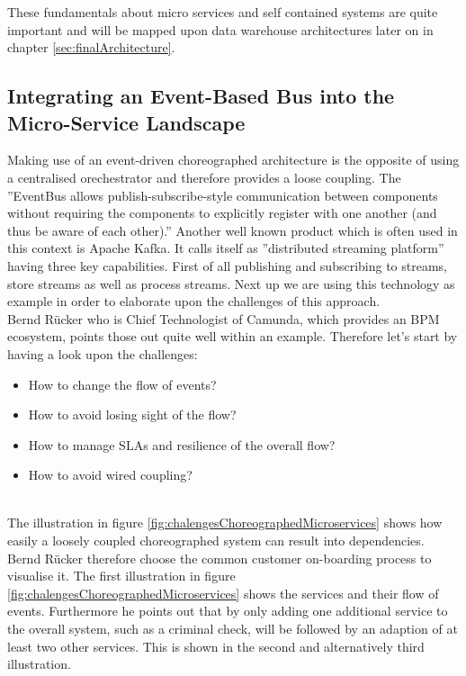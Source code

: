 These fundamentals about micro services and self contained systems are quite important and will be mapped upon data warehouse architectures later on in chapter \ref{sec:finalArchitecture}.

\subsection{Integrating an Event-Based Bus into the Micro-Service Landscape}
Making use of an event-driven choreographed architecture is the opposite of using a centralised orechestrator and therefore provides a loose coupling. The ''EventBus allows publish-subscribe-style communication between components without requiring the components to explicitly register with one another (and thus be aware of each other).'' \cite{EventBusExplained} \newline
Another well known product which is often used in this context is Apache Kafka. It calls itself as ''distributed streaming platform'' having three key capabilities. First of all publishing and subscribing to streams, store streams as well as process streams.\cite{kafka}
Next up we are using this technology as example in order to elaborate upon the challenges of this approach.\newline
\\
Bernd Rücker who is Chief Technologist of Camunda, which provides an BPM ecosystem, points those out quite well within an example. Therefore let's start by having a look upon the challenges:
\begin{itemize}
    \item How to change the flow of events?
    \item How to avoid losing sight of the flow?
    \item How to manage SLAs and resilience of the overall flow?
    \item How to avoid wired coupling?
\end{itemize}
\cite{eventDrivenMicroservices}\newline
\\
The illustration in figure \ref{fig:chalengesChoreographedMicroservices} shows how easily a loosely coupled choreographed system can result into dependencies. Bernd Rücker therefore choose the common customer on-boarding process to visualise it. The first illustration in figure \ref{fig:chalengesChoreographedMicroservices} shows the services and their flow of events. Furthermore he points out that by only adding one additional service to the overall system, such as a criminal check, will be followed by an adaption of at least two other services. This is shown in the second and alternatively third illustration.\cite{eventDrivenMicroservices}\newline
